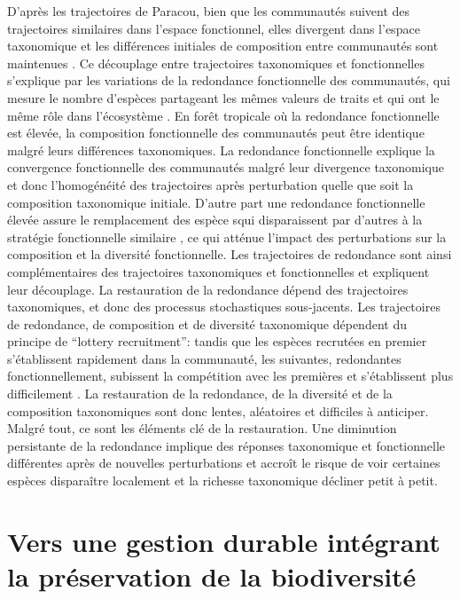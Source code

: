 \documentclass[
  11pt,
  french,
  A4paper,
  extrafontsizes,onecolumn,openright
  ]{memoir}
\begin{document}
D'après les trajectoires de Paracou, bien que les communautés suivent
des trajectoires similaires dans l'espace fonctionnel, elles divergent
dans l'espace taxonomique et les différences initiales de composition
entre communautés sont maintenues \autocite{Fukami2005}. Ce découplage
entre trajectoires taxonomiques et fonctionnelles s'explique par les
variations de la redondance fonctionnelle des communautés, qui mesure le
nombre d'espèces partageant les mêmes valeurs de traits et qui ont le
même rôle dans l'écosystème \autocite{Bellwood2006}. En forêt tropicale
où la redondance fonctionnelle est élevée, la composition fonctionnelle
des communautés peut être identique malgré leurs différences
taxonomiques. La redondance fonctionnelle explique la convergence
fonctionnelle des communautés malgré leur divergence taxonomique et donc
l'homogénéité des trajectoires après perturbation quelle que soit la
composition taxonomique initiale. D'autre part une redondance
fonctionnelle élevée assure le remplacement des espèce squi
disparaissent par d'autres à la stratégie fonctionnelle similaire
\autocite{Carmona2016}, ce qui atténue l'impact des perturbations sur la
composition et la diversité fonctionnelle. Les trajectoires de
redondance sont ainsi complémentaires des trajectoires taxonomiques et
fonctionnelles et expliquent leur découplage. La restauration de la
redondance dépend des trajectoires taxonomiques, et donc des processus
stochastiques sous-jacents. Les trajectoires de redondance, de
composition et de diversité taxonomique dépendent du principe de
``lottery recruitment'': tandis que les espèces recrutées en premier
s'établissent rapidement dans la communauté, les suivantes, redondantes
fonctionnellement, subissent la compétition avec les premières et
s'établissent plus difficilement \autocite{Busing2002}. La restauration
de la redondance, de la diversité et de la composition taxonomiques sont
donc lentes, aléatoires et difficiles à anticiper. Malgré tout, ce sont
les éléments clé de la restauration. Une diminution persistante de la
redondance implique des réponses taxonomique et fonctionnelle
différentes après de nouvelles perturbations et accroît le risque de
voir certaines espèces disparaître localement et la richesse taxonomique
décliner petit à petit.

\section{Vers une gestion durable intégrant la préservation de la
biodiversité}\label{vers-une-gestion-durable-integrant-la-preservation-de-la-biodiversite}
\end{document}
